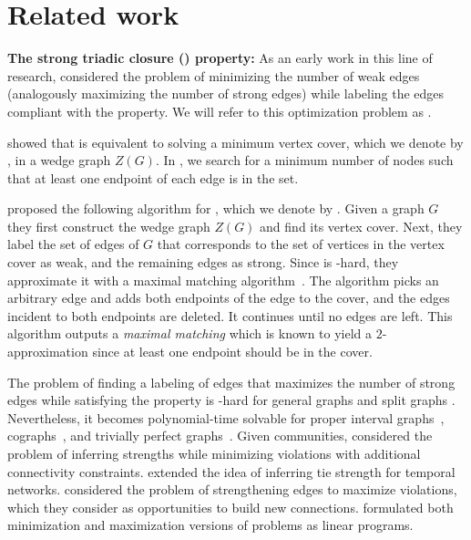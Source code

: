 \section{Related work}
\label{sec:related}

\textbf{The strong triadic closure (\stc) property:}
As an early work in this line of research, \citet{sintos2014using} considered the problem of minimizing the number of weak edges (analogously maximizing the number of strong edges) while labeling the edges compliant with the \stc property.
We will refer to this optimization problem as \prbminSTC.

\citet{sintos2014using} showed
that \prbminSTC is equivalent to solving a minimum vertex cover, which we denote by \prbcovermin, in a wedge graph $Z(G)$.
In \prbcovermin, we search for a minimum number of nodes such that at least one endpoint of each edge is in the set.

\citet{sintos2014using} proposed the following algorithm for \prbminSTC, which we denote by \algminstc.
Given a graph $G$ they first construct the wedge graph $Z(G)$ and find its vertex cover. Next, they label the set of edges of $G$ that corresponds to the set of vertices in the vertex cover as weak, and the remaining edges as strong. Since \prbcovermin is \np-hard, they approximate it with a maximal matching algorithm~\citep{clarkson1983modification}. The algorithm picks an arbitrary edge and adds both endpoints of the edge to the cover, and the edges incident to both endpoints are deleted. It continues until no edges are left. This algorithm outputs a {\em maximal matching} which is known to yield a $2$-approximation since at least one endpoint should be in the cover.

The problem of finding a labeling of edges that maximizes the number of strong edges while satisfying the \stc property is \np-hard for general graphs \cite{sintos2014using} and split graphs \cite{konstantinidis2020maximizing}. 
Nevertheless, it becomes polynomial-time solvable for proper interval
graphs~\cite{konstantinidis2020maximizing}, cographs~\cite{konstantinidis2018strong}, and trivially perfect graphs~\cite{konstantinidis2020maximizing}.
Given communities, \citet{rozenshtein2017inferring} considered the problem of inferring strengths while minimizing \stc violations with additional connectivity constraints.
\citet{oettershagen2022inferring} extended the idea of inferring tie strength for temporal networks.
\citet{matakos2022strengthening} considered the problem of strengthening edges to maximize \stc violations, which they consider as opportunities to build new connections.
\citet{adriaens2020relaxing} formulated both minimization and maximization versions of \stc problems as linear programs.

